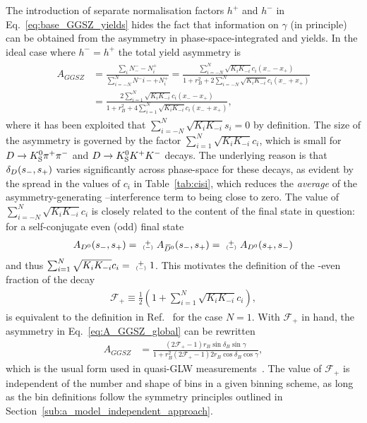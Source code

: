 The introduction of separate normalisation factors $h^+$ and $h^-$ in Eq.~\eqref{eq:base_GGSZ_yields} hides the fact that information on $\gamma$ (in principle) can be obtained from the asymmetry in phase-space-integrated \Bp and \Bm yields. In the ideal case where $h^-=h^+$ the total yield asymmetry is 
\begin{align}\begin{split}\label{eq:A_GGSZ_global}
    A_{GGSZ} &= \frac{\sum_i N^-_- - N^+_i}{\sum_{i=-N}^N N^-i- + N^+_i}
    = \frac{ \sum_{i=-N}^N \sqrt{K_iK_{-i}}c_i (x_- - x_+)}{1 + r_B^2 +2 \sum_{i=-N}^N \sqrt{K_iK_{-i}}c_i (x_- + x_+)} \\
    &=\frac{2 \sum_{i=1}^N \sqrt{K_iK_{-i}}c_i (x_- - x_+)}{1 + r_B^2 +4 \sum_{i=1}^N \sqrt{K_iK_{-i}}c_i (x_- + x_+) },
\end{split}\end{align}
where it has been exploited that $\sum_{i=-N}^N \sqrt{K_iK_{-i}}s_i=0$ by definition. The size of the asymmetry is governed by the factor $\sum_{i=1}^N \sqrt{K_iK_{-i}}c_i$, which is small for ${{D}\rightarrow{\ensuremath{{K}^0_{\mathrm{S}}}}{\ensuremath{{\pi}^+}}{\ensuremath{{\pi}^-}}}$ and ${D}\rightarrow{\ensuremath{{K}^0_{\mathrm{S}}}}{\ensuremath{{K}^+}}{\ensuremath{{K}^-}}$ decays. The underlying reason is that $\delta_D(s_-, s_+)$ varies significantly across phase-space for these decays, as evident by the spread in the values of $c_i$ in Table~\ref{tab:cisi}, which reduces the \emph{average} of the asymmetry-generating \Dz--\Dzb interference term to being close to zero. The value of $\sum_{i=-N}^N \sqrt{K_iK_{-i}}c_i$ is closely related to the \CP content of the final state in question: for a self-conjugate \CP even (odd) final state  
\begin{align}
    {A_\Dz(\sm, \sp)=\varpm A_\Dzb(\sm, \sp)=\varpm A_\Dz(\sp, \sm)}
\end{align}
 and thus $\sum_{i=1}^N \sqrt{K_iK_{-i}}c_i= \varpm 1$. This motivates the definition of the \CP-even fraction of the decay
\begin{align}\label{eq:Fplus_global}
    \mathcal F_+ \equiv \frac{1}{2}\left(1 + \sum_{i=1}^N \sqrt{K_i K_{-i}}c_i\right),
\end{align}
is equivalent to the definition in Ref.~\cite{nayakFirstDeterminationCP2015} for the case $N=1$.  With $\mathcal F_+$ in hand, the asymmetry in Eq.~\eqref{eq:A_GGSZ_global} can be rewritten
\begin{align}
    A_{GGSZ} &= \frac{(2\mathcal F_+-1) r_B \sin \delta_B \sin \gamma}{1 + r_B^2 (2\mathcal F_+-1) 2 r_B \cos \delta_B \cos \gamma},
\end{align}
which is the usual form used in quasi-GLW measurements~\cite{nayakFirstDeterminationCP2015,maldeFirstDeterminationCP2015}. The value of $\mathcal F_+$ is independent of the number and shape of bins in a given binning scheme, as long as the bin definitions follow the symmetry principles outlined in Section~\ref{sub:a_model_independent_approach}. 
